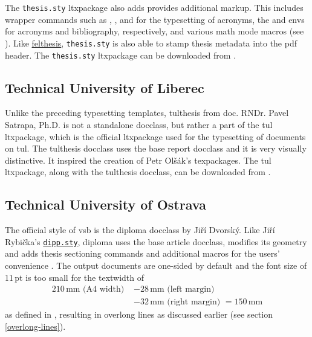     The \texttt{thesis.sty} \gls{ltxpackage} also adds provides additional markup. This includes wrapper commands such as , ,  and  for the typesetting of acronyms, the  and  \glspl{env} for acronyms and bibliography, respectively, and various math mode macros (see \cite[p.~6--9]{thesis.sty-doc}). Like \hyperref[sec:felthesis]{felthesis}, \texttt{thesis.sty} is also able to stamp thesis metadata into the \gls{pdf} header. The \texttt{thesis.sty} \gls{ltxpackage} can be downloaded from \cite{thesis.sty}.

    \subsection{Technical University of Liberec}
    Unlike the preceding typesetting templates, tulthesis from doc. RNDr. Pavel Satrapa, Ph.D. is not a standalone \gls{docclass}, but rather a part of the tul \gls{ltxpackage}, which is the official \gls{ltxpackage} used for the typesetting of documents on \gls{tul}. The tulthesis \gls{docclass} uses the base report \gls{docclass} \cite[section~1]{tulthesis-man} and it is very visually distinctive. It inspired \cite[post~21]{ctustyle-forums} the creation of Petr Olšák's  \glspl{texpackage}. The tul \gls{ltxpackage}, along with the tulthesis \gls{docclass}, can be downloaded from \cite{tul}.

    \subsection{Technical University of Ostrava}
    The official style of \gls{vsb} is the diploma \gls{docclass} by Jiří Dvorský. Like Jiří Rybička's \hyperref[sec:dipp.sty]{\tt dipp.sty}, diploma uses the base article \gls{docclass}, modifies its geometry and adds thesis sectioning commands and additional macros for the users' convenience \cite{diploma}. The output documents are one-sided by default and the font size of 11\,pt is too small for the \gls{textwidth} of \begin{equation}
      \begin{split}
        210\,\text{mm} \text{ (A4 width) } &- 28\,\text{mm} \text{ (left margin) }  \\
                                           &- 32\,\text{mm} \text{ (right margin) }
                                            = 150\,\text{mm}
      \end{split}
    \end{equation} as defined in \cite[lines~111,~123]{diplomaSource}, resulting in overlong lines as discussed earlier (see section \ref{overlong-lines}).

